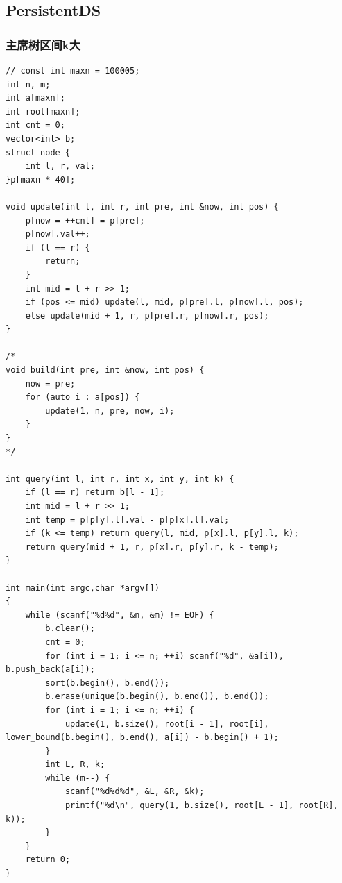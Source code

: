 \documentclass[twoside]{article}
\begin{document}
\subsection{PersistentDS}
\subsubsection{主席树区间k大}
\begin{lstlisting}
// const int maxn = 100005;
int n, m;
int a[maxn];
int root[maxn];
int cnt = 0;
vector<int> b;
struct node {
    int l, r, val;
}p[maxn * 40];

void update(int l, int r, int pre, int &now, int pos) {
    p[now = ++cnt] = p[pre];
    p[now].val++;
    if (l == r) {
        return;
    }
    int mid = l + r >> 1;
    if (pos <= mid) update(l, mid, p[pre].l, p[now].l, pos);
    else update(mid + 1, r, p[pre].r, p[now].r, pos);
}

/*
void build(int pre, int &now, int pos) {
    now = pre;
    for (auto i : a[pos]) {
        update(1, n, pre, now, i);
    }
}
*/

int query(int l, int r, int x, int y, int k) {
    if (l == r) return b[l - 1];
    int mid = l + r >> 1;
    int temp = p[p[y].l].val - p[p[x].l].val;
    if (k <= temp) return query(l, mid, p[x].l, p[y].l, k);
    return query(mid + 1, r, p[x].r, p[y].r, k - temp);
}

int main(int argc,char *argv[])
{
    while (scanf("%d%d", &n, &m) != EOF) {
        b.clear();
        cnt = 0;
        for (int i = 1; i <= n; ++i) scanf("%d", &a[i]), b.push_back(a[i]);
        sort(b.begin(), b.end());
        b.erase(unique(b.begin(), b.end()), b.end());
        for (int i = 1; i <= n; ++i) {
            update(1, b.size(), root[i - 1], root[i], lower_bound(b.begin(), b.end(), a[i]) - b.begin() + 1);
        }
        int L, R, k;
        while (m--) {
            scanf("%d%d%d", &L, &R, &k);
            printf("%d\n", query(1, b.size(), root[L - 1], root[R], k));
        }
    }
    return 0;
}\end{lstlisting}
\end{document}
